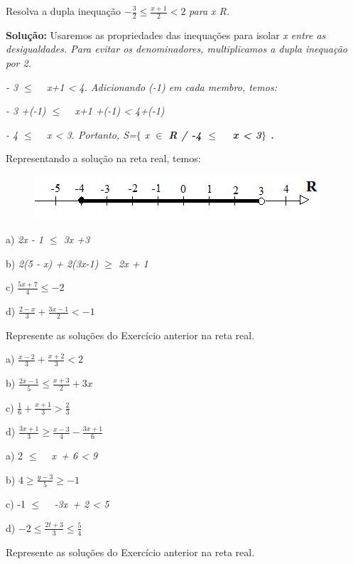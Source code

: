 \begin{texemplo}
Resolva a dupla inequação \( -\frac{3}{2} \leq \frac{x+1}{2}<2 \) \textit{ para x  R.}

\textbf{Solução:} Usaremos as propriedades das inequações para isolar \textit{x entre as desigualdades. Para evitar os denominadores, multiplicamos a dupla inequação por 2.}

\textit{- 3  $ \leq $  ~ x+1  <  4.  Adicionando (-1) em cada membro, temos:}

\textit{- 3 +(-1) $ \leq $  ~ x+1 +(-1) <  4+(-1)}

\textit{- 4  $ \leq $  ~ x  <  3. Portanto, S=$ \{ $ x $\in$ \textbf{R / -4  $ \leq $  ~ x  <  3$ \} $ . }}

Representando a solução na reta real, temos:

\begin{figure}[H]
		\includegraphics[width=4.2in,height=0.64in]{capitulos/inequacoes/media/image4.png}\qedsymbol{}
	\centering
\end{figure}
\end{texemplo}

\begin{exercicios}

	a) \textit{2x - 1 $ \leq $  3x +3 }

    b) \textit{2(5 - x) + 2(3x-1) $ \geq $  2x + 1 }
    
    c)  \( \frac{5x+7}{4} \leq -2 \)
    
    d) \( \frac{2-x}{3}+\frac{3x-1}{2}<-1 \)

	\item Represente as soluções do Exercício anterior na reta real.


	a) \( \frac{x-2}{3}+\frac{x+2}{3}<2 \)

    b) \( \frac{2x-1}{5} \leq \frac{x+3}{2}+3x \)
    
    c)  \( \frac{1}{6}+\frac{x+1}{3}>\frac{2}{3} \)
    
    d)  \( \frac{3x+1}{3} \geq \frac{x-3}{4}-\frac{3x+1}{6} \) 


	a) 2 \textit{$ \leq $ ~ x~+ 6  < 9}

    b)  \( 4 \geq \frac{y-3}{5} \geq -1 \)
    
    c) -1 \textit{$ \leq $ ~ -3x~+ 2  < 5}
    
    d)  \( -2 \leq \frac{2t+3}{3} \leq \frac{5}{4} \)

	\item Represente as soluções do Exercício anterior na reta real.
\end{exercicios}

